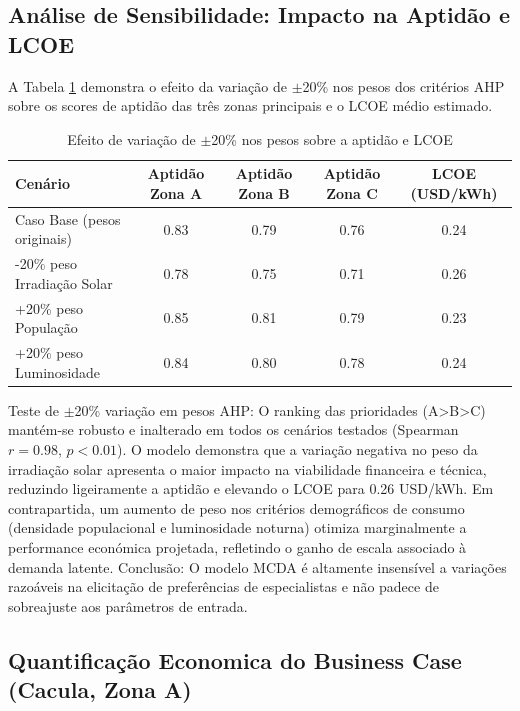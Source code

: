 \documentclass[12pt, a4paper]{article}
\begin{document}
\subsection{Análise de Sensibilidade: Impacto na Aptidão e LCOE}

A Tabela \ref{Tab:Sensibilidade} demonstra o efeito da variação de $\pm$20\% nos pesos dos critérios AHP sobre os scores de aptidão das três zonas principais e o LCOE médio estimado.

\begin{table}[H]
\centering
\caption{Efeito de variação de $\pm$20\% nos pesos sobre a aptidão e LCOE}
\label{Tab:Sensibilidade}
\footnotesize
\begin{tabular}{|l|c|c|c|c|}
\hline
\textbf{Cenário} & \textbf{Aptidão Zona A} & \textbf{Aptidão Zona B} & \textbf{Aptidão Zona C} & \textbf{LCOE (USD/kWh)} \\
\hline
Caso Base (pesos originais) & 0.83 & 0.79 & 0.76 & 0.24 \\
\hline
-20\% peso Irradiação Solar & 0.78 & 0.75 & 0.71 & 0.26 \\
\hline
+20\% peso População & 0.85 & 0.81 & 0.79 & 0.23 \\
\hline
+20\% peso Luminosidade & 0.84 & 0.80 & 0.78 & 0.24 \\
\hline
\end{tabular}
\end{table}

Teste de $\pm$20\% variação em pesos AHP: O ranking das prioridades (A>B>C) mantém-se robusto e inalterado em todos os cenários testados (Spearman $r=0.98$, $p<0.01$). O modelo demonstra que a variação negativa no peso da irradiação solar apresenta o maior impacto na viabilidade financeira e técnica, reduzindo ligeiramente a aptidão e elevando o LCOE para 0.26 USD/kWh. Em contrapartida, um aumento de peso nos critérios demográficos de consumo (densidade populacional e luminosidade noturna) otimiza marginalmente a performance económica projetada, refletindo o ganho de escala associado à demanda latente. Conclusão: O modelo MCDA é altamente insensível a variações razoáveis na elicitação de preferências de especialistas e não padece de sobreajuste aos parâmetros de entrada.

\subsection{Quantificação Economica do Business Case (Cacula, Zona A)}
\end{document}
